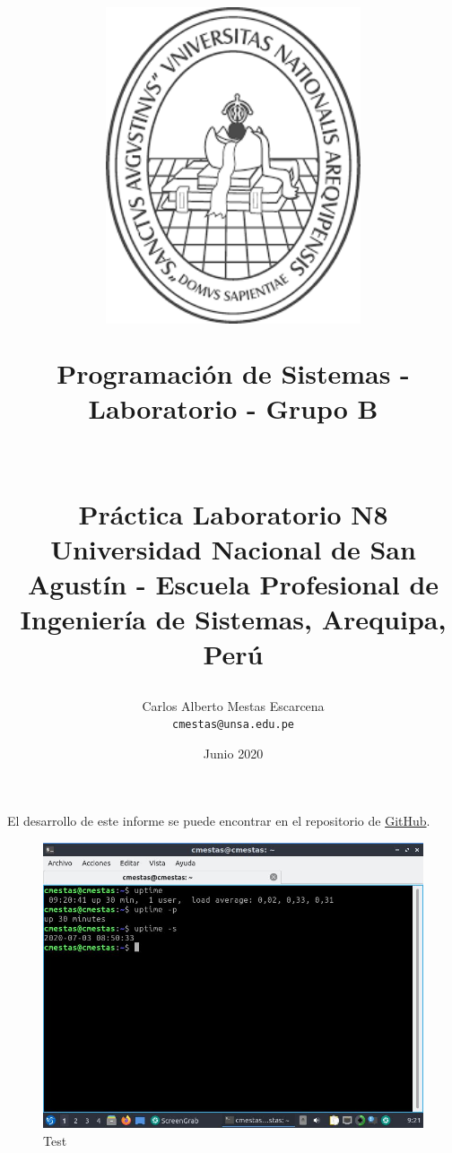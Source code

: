 \documentclass[12pt]{article}
\title{
\centerline{
    \includegraphics[width=75mm]{unsa.png}}
    \vspace{0.5 cm}
        Programación de Sistemas - Laboratorio - Grupo B
        \\
        \\
        \\
        \textbf{Práctica Laboratorio N8} 
        \large  
        \\
        \small Universidad Nacional de San Agustín - Escuela Profesional de Ingeniería de Sistemas, Arequipa, Perú 
  }
\author{
    Carlos Alberto Mestas Escarcena
    \\
    \texttt{cmestas@unsa.edu.pe}
}
\date{Junio 2020}
\begin{document}
\maketitle

El desarrollo de este informe se puede encontrar en el repositorio de \textcolor{blue}{
    \href{https://github.com/CarlosMestas/Programacion_de_Sistemas_Laboratorio_B_Carlos_Mestas_Practica7}{GitHub}}.
    

\clearpage
\newpage

\begin{figure}[h]
    \centering
    \includegraphics[width=1\textwidth]{images/screenA01.jpg}
    \caption{Test}
\end{figure}
\end{document}
